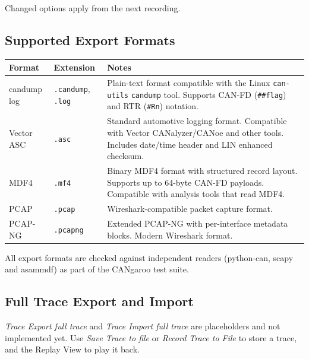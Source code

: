 \documentclass[a4paper,11pt]{article}
\newcommand{\menu}[1]{\textit{#1}}
\newcommand{\file}[1]{\texttt{#1}}
\begin{document}
Changed options apply from the next recording.

\subsection{Supported Export Formats}

\begin{longtable}{p{3cm} p{2.5cm} p{7.5cm}}
  \toprule
  \textbf{Format} & \textbf{Extension} & \textbf{Notes} \\
  \midrule
  \endhead
  candump log     & \file{.candump}, \file{.log} & Plain-text format compatible with the Linux
                                      \texttt{can-utils} \texttt{candump} tool.
                                      Supports CAN-FD (\texttt{\#\#flag}) and
                                      RTR (\texttt{\#Rn}) notation. \\[0.4em]
  Vector ASC      & \file{.asc}     & Standard automotive logging format.
                                      Compatible with Vector CANalyzer/CANoe and
                                      other tools. Includes date/time header and
                                      LIN enhanced checksum. \\[0.4em]
  MDF4            & \file{.mf4}     & Binary MDF4 format with structured record
                                      layout. Supports up to 64-byte CAN-FD payloads.
                                      Compatible with analysis tools that read MDF4. \\[0.4em]
  PCAP            & \file{.pcap}    & Wireshark-compatible packet capture format. \\[0.4em]
  PCAP-NG         & \file{.pcapng}  & Extended PCAP-NG with per-interface metadata
                                      blocks. Modern Wireshark format. \\
  \bottomrule
\end{longtable}

All export formats are checked against independent readers (python-can, scapy and
asammdf) as part of the CANgaroo test suite.

\subsection{Full Trace Export and Import}

\menu{Trace \textrightarrow{} Export full trace} and \menu{Trace \textrightarrow{} Import full trace}
are placeholders and not implemented yet. Use \menu{Save Trace to file} or
\menu{Record Trace to File} to store a trace, and the Replay View to play it back.
\end{document}
